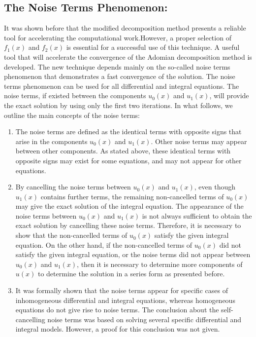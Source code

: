 \documentclass[11pt]{report}
\begin{document}
	\subsection{The Noise Terms Phenomenon:}
	It was shown before that the modified decomposition method presents a reliable tool for accelerating the computational work.However, a proper selection of $f_1(x)$ and $f_2(x)$ is essential for a successful use of this technique. A useful tool that will accelerate the convergence of the Adomian decomposition method is developed. The new technique depends mainly on the so-called noise terms phenomenon that demonstrates a fast convergence of the solution. The noise terms phenomenon can be used for all differential and integral equations. The noise terms, if existed between the components $u_0(x)$ and $u_1(x)$, will provide the exact solution by using only the first two iterations. In what follows, we outline the main concepts of the noise terms:
	\begin{enumerate}
		\item The noise terms are defined as the identical terms with opposite signs that arise in the components $u_0(x)$ and $u_1(x)$. Other noise terms may appear between other components. As stated above, these identical terms with opposite signs may exist for some equations, and may not appear for other equations.
		
		\item  By cancelling the noise terms between $u_0(x)$ and $u_1(x)$, even though $u_1(x)$ contains further terms, the remaining non-cancelled terms of $u_0(x)$ may give the exact solution of the integral equation. The appearance of the noise terms between $u_0(x)$ and $u_1(x)$ is not always sufficient to obtain the exact solution by cancelling these noise terms. Therefore, it is necessary to show that the non-cancelled terms of $u_0(x)$ satisfy the given integral equation. On the other hand, if the non-cancelled terms of $u_0(x)$ did not satisfy the given integral equation, or the noise terms did not appear between $u_0(x)$ and $u_1(x)$, then it is necessary to determine more components of $u(x)$ to determine the solution in a series form as presented before.
		
		\item It was formally shown that the noise terms appear for specific cases of inhomogeneous differential and integral equations, whereas homogeneous equations do not give rise to noise terms. The conclusion about the self-cancelling noise terms was based on solving several specific differential and integral models. However, a proof for this conclusion was not given.
	\end{enumerate}
	
\end{document}

